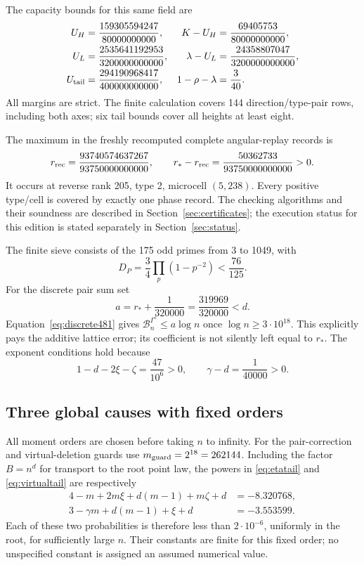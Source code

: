 The capacity bounds for this same field are
\begin{align*}
 U_H&=\frac{159305594247}{80000000000},
 &K-U_H&=\frac{69405753}{80000000000},\\
 U_L&=\frac{2535641192953}{3200000000000},
 &\lambda-U_L&=\frac{24358807047}{3200000000000},\\
 U_{\rm tail}&=\frac{294190968417}{400000000000},
 &1-\rho-\lambda&=\frac3{40}.
\end{align*}
All margins are strict. The finite calculation covers 144 direction/type-pair
rows, including both axes; six tail bounds cover all heights at least eight.

The maximum in the freshly recomputed complete angular-replay records is
\begin{equation}\label{eq:recordedrisk481}
 r_{\rm rec}=\frac{93740574637267}{93750000000000},\qquad
 r_*-r_{\rm rec}=\frac{50362733}{93750000000000}>0.
\end{equation}
It occurs at reverse rank 205, type 2, microcell \((5,238)\).
Every positive type/cell is covered by exactly one phase record.
The checking algorithms and their soundness are described in
Section~\ref{sec:certificates}; the execution status for this edition
is stated separately in Section~\ref{sec:status}.

The finite sieve consists of the 175 odd primes from 3 to 1049, with
\[
 D_P=\frac34\prod_p(1-p^{-2})<\frac{76}{125}.
\]
For the discrete pair sum set
\begin{equation}\label{eq:adiscrete}
 a=r_*+\frac1{320000}=\frac{319969}{320000}<d.
\end{equation}
Equation~\eqref{eq:discrete481} gives
\(\mathcal B_n^{\Gamma^c}\le a\log n\) once
\(\log n\ge3\cdot10^{18}\). This explicitly pays the additive
lattice error; its coefficient is not silently left equal to \(r_*\).
The exponent conditions hold because
\[
 1-d-2\xi-\zeta=\frac{47}{10^6}>0,\qquad
 \gamma-d=\frac1{40000}>0.
\]

\subsection{Three global causes with fixed orders}
All moment orders are chosen before taking \(n\) to infinity.
For the pair-correction and virtual-deletion guards use
\(m_{\rm guard}=2^{18}=262144\). Including the factor \(B=n^d\)
for transport to the root point law, the powers in
\eqref{eq:etatail} and \eqref{eq:virtualtail} are respectively
\begin{align*}
 4-m+2m\xi+d(m-1)+m\zeta+d&=-8.320768,\\
 3-\gamma m+d(m-1)+\xi+d&=-3.553599.
\end{align*}
Each of these two probabilities is therefore less than \(2\cdot10^{-6}\),
uniformly in the root, for sufficiently large \(n\). Their constants
are finite for this fixed order; no unspecified constant is assigned
an assumed numerical value.

